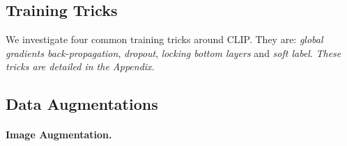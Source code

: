 \documentclass[letterpaper]{article} %
\begin{document}
\subsection{Training Tricks} \label{sec:3.1}
We investigate four common training tricks around CLIP.
They are: \emph{global gradients back-propagation}, \emph{dropout}, \emph{locking bottom layers} and \emph{soft label}.
\emph{These tricks are detailed in the Appendix.}

\subsection{Data Augmentations} \label{sec:3.2}



\paragraph{Image Augmentation.}
\end{document}
